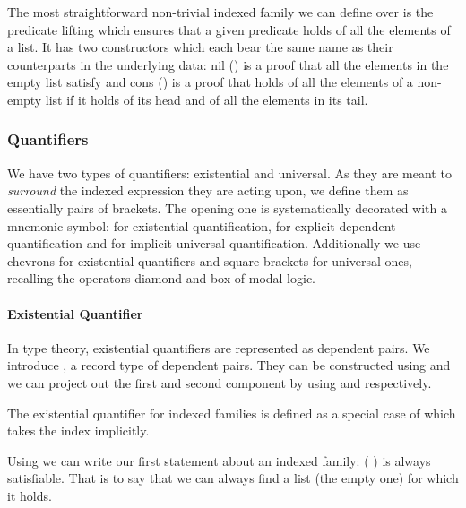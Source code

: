 
The most straightforward non-trivial indexed family we can define over
 is the predicate lifting  which ensures that a given
predicate  holds of all the elements of a list. It has two
constructors which each bear the same name as their counterparts in the
underlying data: nil (\AIC{[]}) is a proof that all the elements in the
empty list satisfy  and cons (\AIC{\_::\_}) is a proof that 
holds of all the elements of a non-empty list if it holds of its head
and of all the elements in its tail.


\subsubsection{Quantifiers}

We have two types of quantifiers: existential and universal. As they are
meant to \emph{surround} the indexed expression they are acting upon, we
define them as essentially pairs of brackets. The opening one is systematically
decorated with a mnemonic symbol:  for existential quantification,
 for explicit dependent quantification and  for implicit
universal quantification. Additionally we use chevrons for existential
quantifiers and square brackets for universal ones, recalling the operators
diamond and box of modal logic.

\paragraph{Existential Quantifier} In type theory, existential quantifiers
are represented as dependent pairs. We introduce , a record type of
dependent pairs. They can be constructed using \AIC{\_,\_} and we can project
out the first and second component by using  and 
respectively.


The existential quantifier for indexed families is defined as a special
case of  which takes the index  implicitly.


Using  we can write our first statement about an indexed family:
{( )} is always satisfiable. That is to say that we can always
find a list (the empty one) for which it holds.

